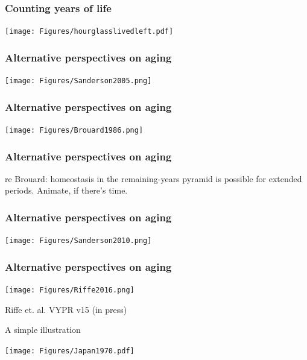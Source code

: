 \documentclass[20pt]{beamer}
\begin{document}

\begin{frame}
\frametitle{Counting years of life}
\begin{center}
\texttt{[image: Figures/hourglasslivedleft.pdf]}
\end{center}
\end{frame}


\begin{frame}
\frametitle{Alternative perspectives on aging}
\begin{center}
\texttt{[image: Figures/Sanderson2005.png]}
\end{center}
\end{frame}


\begin{frame}
\frametitle{Alternative perspectives on aging}
\begin{center}
\texttt{[image: Figures/Brouard1986.png]}
\end{center}
\end{frame}

\begin{frame}
\frametitle{Alternative perspectives on aging} 
re Brouard: homeostasis in the remaining-years pyramid is possible for extended
periods. Animate, if there's time.
\end{frame}


\begin{frame}
\frametitle{Alternative perspectives on aging}
\begin{center}
\texttt{[image: Figures/Sanderson2010.png]}
\end{center}
\end{frame}


\begin{frame}
\frametitle{Alternative perspectives on aging}
\begin{center}
\texttt{[image: Figures/Riffe2016.png]}
\end{center}
Riffe et. al. VYPR v15 (in press)
\end{frame}


\begin{frame}{A simple illustration}
\begin{center}
 \texttt{[image: Figures/Japan1970.pdf]}
\end{center}
\end{frame}
\end{document}
